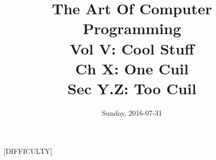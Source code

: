 \documentclass{amsart}
\title{The Art Of Computer Programming\\Vol V: Cool Stuff\\Ch X: One Cuil\\Sec Y.Z: Too Cuil}
\date{Sunday, 2016-07-31}
\begin{document}
\maketitle

\begin{problem}{[}DIFFICULTY{]}
\end{problem}

\begin{solution}
\end{solution}
\end{document}
